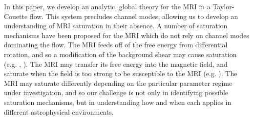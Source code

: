 \documentclass{emulateapj}
\newcommand{\citei}[1]{\citeauthor{#1} \citeyear{#1}}
\begin{document}

In this paper, we develop an analytic, global theory for the MRI in a Taylor-Couette flow. This system precludes channel modes, allowing us to develop an understanding of MRI saturation in their absence. A number of saturation mechanisms have been proposed for the MRI which do not rely on channel modes dominating the flow. The MRI feeds off of the free energy from differential rotation, and so a modification of the background shear may cause saturation (e.g. \citei{Knobloch:2005ba}, \citei{Umurhan:2007hs}). The MRI may transfer its free energy into the magnetic field, and saturate when the field is too strong to be susceptible to the MRI (e.g. \citei{Ebrahimi:2009ey}). The MRI may saturate differently depending on the particular parameter regime under investigation, and so our challenge is not only in identifying possible saturation mechanisms, but in understanding how and when each applies in different astrophysical environments. 
\end{document}
